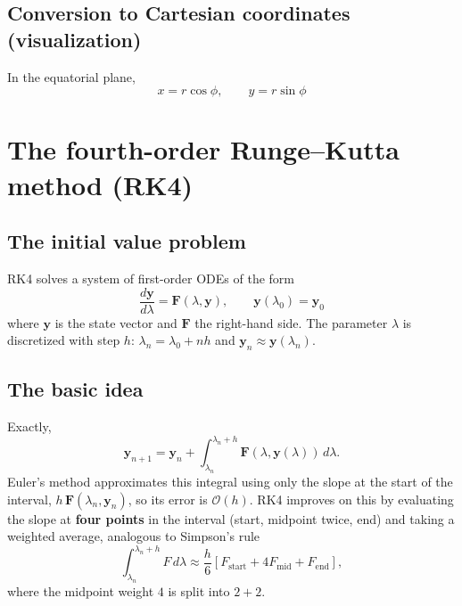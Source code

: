 \documentclass[11pt,a4paper]{article}
\begin{document}
\subsection{Conversion to Cartesian coordinates (visualization)}

In the equatorial plane,
\begin{equation*}
x = r\cos\phi, \qquad y = r\sin\phi \tag{32}\label{eq:32}
\end{equation*}

\section{The fourth-order Runge--Kutta method (RK4)}

\subsection{The initial value problem}

RK4 solves a system of first-order ODEs of the form
\begin{equation*}
\frac{d\mathbf{y}}{d\lambda} = \mathbf{F}(\lambda, \mathbf{y}), \qquad \mathbf{y}(\lambda_0) = \mathbf{y}_0 \tag{33}\label{eq:33}
\end{equation*}
where $\mathbf{y}$ is the state vector and $\mathbf{F}$ the right-hand side. The parameter $\lambda$ is discretized with step $h$: $\lambda_n = \lambda_0 + n h$ and $\mathbf{y}_n \approx \mathbf{y}(\lambda_n)$.

\subsection{The basic idea}

Exactly,
\begin{equation*}
\mathbf{y}_{n+1} = \mathbf{y}_n + \int_{\lambda_n}^{\lambda_n + h} \mathbf{F}(\lambda, \mathbf{y}(\lambda))\, d\lambda .
\end{equation*}
Euler's method approximates this integral using only the slope at the start of the interval, $h\,\mathbf{F}(\lambda_n, \mathbf{y}_n)$, so its error is $\mathcal{O}(h)$. RK4 improves on this by evaluating the slope at \textbf{four points} in the interval (start, midpoint twice, end) and taking a weighted average, analogous to Simpson's rule
\begin{equation*}
\int_{\lambda_n}^{\lambda_n + h} F\, d\lambda \approx \frac{h}{6}\left[F_{\text{start}} + 4F_{\text{mid}} + F_{\text{end}}\right],
\end{equation*}
where the midpoint weight $4$ is split into $2 + 2$.
\end{document}
